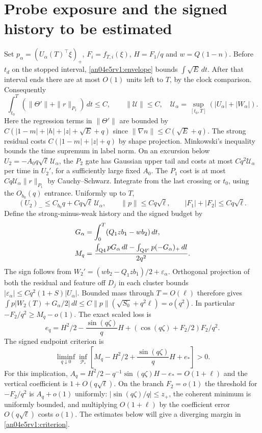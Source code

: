 \documentclass[11pt]{article}
\newcommand{\dd}{\,dl}
\newcommand{\dt}{\,dt}
\begin{document}
\section{Probe exposure and the signed history to be estimated}\label{an04e5rv1:history}
Set $p_\alpha=(U_\alpha(T)^\top\xi)_+$, $F_i=f_{T,i}(\xi)$, $H=F_1/q$ and $w=Q(1-n)$. Before $t_d$ on the stopped interval, \eqref{an04e5rv1:envelope} bounds $\int\sqrt E\dt$. After that interval ends there are at most $O(1)$ units left to $T$, by the clock comparison. Consequently
\[
 \int_{t_0}^T(\|\Theta'\|+\|r\|_{P_1})\dt\le C,\qquad
 \|\mathcal U\|\le C,\quad
 \mathcal U_\alpha=\sup_{[t_0,T]}(|U_\alpha|+|W_\alpha|).
\]
Here the regression terms in $\|\Theta'\|$ are bounded by $C(|1-m|+|h|+|z|+\sqrt E+q)$ since $\|\nabla n\|\le C(\sqrt E+q)$. The strong residual costs $C(|1-m|+|z|+q)$ by shape projection. Minkowski's inequality bounds the time supremum in label norm.
On an excursion below $U_2=-A_0q\sqrt\ell\,\mathcal U_\alpha$, the $P_2$ gate has Gaussian upper tail and costs at most $Cq^2\mathcal U_\alpha$ per time in $U_2'$, for a sufficiently large fixed $A_0$. The $P_1$ cost is at most $Cq\mathcal U_\alpha\|r\|_{P_1}$ by Cauchy--Schwarz. Integrate from the last crossing or $t_0$, using the $O_{b_0}(q)$ entrance. Uniformly up to $T$,
\[
 (U_2)_-\le C_{b_0}q+Cq\sqrt\ell\,\mathcal U_\alpha,\qquad
 \|p\|\le Cq\sqrt\ell,\qquad |F_1|+|F_2|\le Cq\sqrt\ell .
\]
Define the strong-minus-weak history and the signed budget by
\begin{align}
 G_\alpha&=\int_0^T (Q_1 z b_1-w b_2)\dt,\nonumber\\
 M_q&=\frac{\int_{\rm Q4}pG_\alpha\dd-\int_{{\rm Q4}^c}p(-G_\alpha)_+\dd}{2q^2}.
 \label{an04e5rv1:budget}
\end{align}
The sign follows from $W_2'=(w b_2-Q_1zb_1)/2+\varepsilon_\alpha$. Orthogonal projection of both the residual and feature off $D_j$ in each cluster bounds $|\varepsilon_\alpha|\le Cq^2(1+S)|U_\alpha|$. Bounded mass through $T=O(\ell)$ therefore gives
$\int p|W_2(T)+G_\alpha/2|\dd\le C\|p\|(\sqrt{S_0}+q^2\ell)=o(q^2)$.
In particular $-F_2/q^2\ge M_q-o(1)$. The exact scaled loss is
\[
 e_q=H^2/2-\frac{\sin(q\zeta)}q H+
 \left(\cos(q\zeta)+F_2/2\right)F_2/q^2 .
\]
The signed endpoint criterion is
\begin{equation}\label{an04e5rv1:criterion}
 \liminf_{q\downarrow0}\inf_{\mathcal P_*}\left[M_q-H^2/2+\frac{\sin(q\zeta)}qH+e_*\right]>0 .
\end{equation}
For this implication, $A_q=H^2/2-q^{-1}\sin(q\zeta)H-e_*=O(1+\ell)$ and the vertical coefficient is $1+O(q\sqrt\ell)$. On the branch $F_2=o(1)$ the threshold for $-F_2/q^2$ is $A_q+o(1)$ uniformly: $|\sin(q\zeta)/q|\le z_+$, the coherent minimum is uniformly bounded, and multiplying $O(1+\ell)$ by the coefficient error $O(q\sqrt\ell)$ costs $o(1)$. The estimates below will give a diverging margin in \eqref{an04e5rv1:criterion}.
\end{document}
